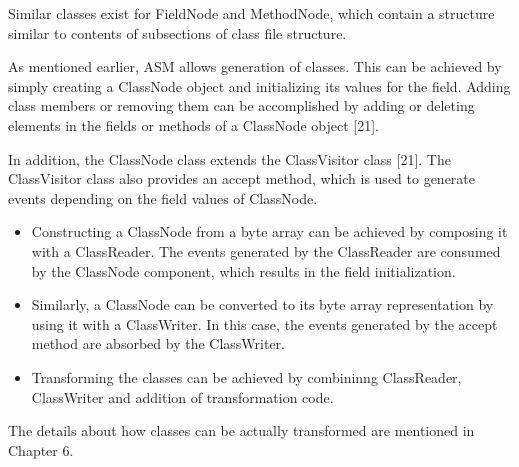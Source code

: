 Similar classes exist for FieldNode and MethodNode, which contain a structure similar to contents of subsections of class file structure.

As mentioned earlier, ASM allows generation of classes. This can be achieved by simply creating a ClassNode object and initializing its values for the field. Adding class members or removing them can be accomplished by adding or deleting elements in the fields or methods of a ClassNode object [21]. 

In addition, the ClassNode class extends the ClassVisitor class [21]. The ClassVisitor class also provides an accept method, which is used to generate events depending on the field values of ClassNode.  

\begin{itemize}
\item Constructing a ClassNode from a byte array can be achieved by composing it with a ClassReader. The events generated by the ClassReader are consumed by the ClassNode component, which results in the field initialization.
\item Similarly, a ClassNode can be converted to its byte array representation by using it with a ClassWriter. In this case, the events generated by the accept method are absorbed by the ClassWriter.
\item Transforming the classes can be achieved by combininng ClassReader, ClassWriter and addition of transformation code.
\end{itemize}

The details about how classes can be actually transformed are mentioned in Chapter 6.

